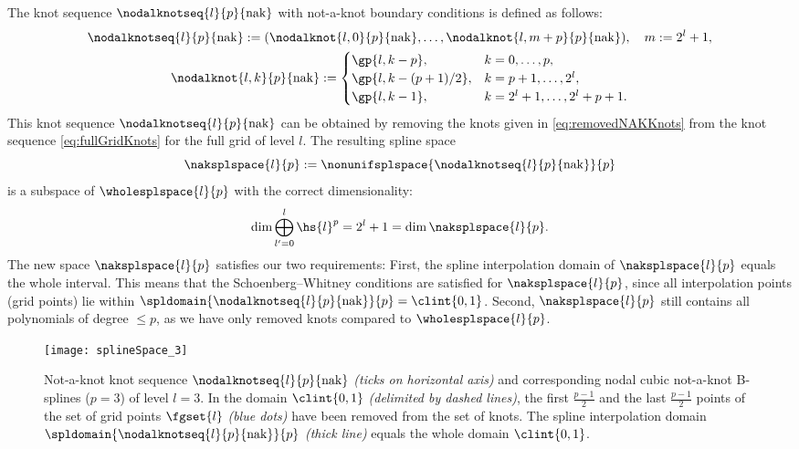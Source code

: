 The knot sequence $\nodalknotseq{l}{p}{\nak}$
with not-a-knot boundary conditions is defined as follows:
\begin{subequations}
  \begin{gather}
    \nodalknotseq{l}{p}{\nak}
    := (\nodalknot{l,0}{p}{\nak}, \dotsc,
    \nodalknot{l,m+p}{p}{\nak}),\quad
    m := 2^l + 1,\\
    \nodalknot{l,k}{p}{\nak}
    :=
    \begin{cases}
      \gp{l,k-p},&
      k = 0, \dotsc, p,\\
      \gp{l,k-(p+1)/2},&
      k = p + 1, \dotsc, 2^l,\\
      \gp{l,k-1},&
      k = 2^l + 1, \dotsc, 2^l + p + 1.
    \end{cases}
  \end{gather}
\end{subequations}
This knot sequence $\nodalknotseq{l}{p}{\nak}$
can be obtained by removing the knots
given in \eqref{eq:removedNAKKnots} from the
knot sequence \eqref{eq:fullGridKnots} for the full grid of level $l$.
The resulting spline space
\begin{equation}
  \naksplspace{l}{p}
  := \nonunifsplspace{\nodalknotseq{l}{p}{\nak}}{p}
\end{equation}
is a subspace
of $\wholesplspace{l}{p}$ with the correct dimensionality:
\begin{equation}
  \dim \bigoplus_{l'=0}^l \hs{l}^p
  = 2^l + 1
  = \dim \naksplspace{l}{p}.
\end{equation}
The new space $\naksplspace{l}{p}$ satisfies our two requirements:
First, the spline interpolation domain of $\naksplspace{l}{p}$
equals the whole interval.
This means that the Schoenberg--Whitney conditions are satisfied
for $\naksplspace{l}{p}$, since all interpolation points
(grid points) lie within
$\spldomain{\nodalknotseq{l}{p}{\nak}}{p} = \clint{0, 1}$.
Second, $\naksplspace{l}{p}$ still contains all polynomials of
degree $\le p$, as we have only removed knots compared to
$\wholesplspace{l}{p}$.

\begin{figure}
  \texttt{[image: splineSpace\_3]}%
  \caption[%
    Nodal not-a-knot B-splines and knot sequence%
  ]{%
    Not-a-knot knot sequence $\nodalknotseq{l}{p}{\nak}$
    \emph{(ticks on horizontal axis)}
    and corresponding nodal cubic not-a-knot B-splines ($p = 3$)
    of level $l = 3$.
    In the domain $\clint{0, 1}$ \emph{(delimited by dashed lines)},
    the first $\tfrac{p-1}{2}$ and the last $\tfrac{p-1}{2}$ points
    of the set of grid points $\fgset{l}$
    \emph{\textcolor{mittelblau}{(blue dots)}}
    have been removed from the set of knots.
    The spline interpolation domain
    $\spldomain{\nodalknotseq{l}{p}{\nak}}{p}$
    \emph{(thick line)}
    equals the whole domain $\clint{0, 1}$.%
  }%
  \label{fig:splineSpaceNotAKnot}%
\end{figure}

